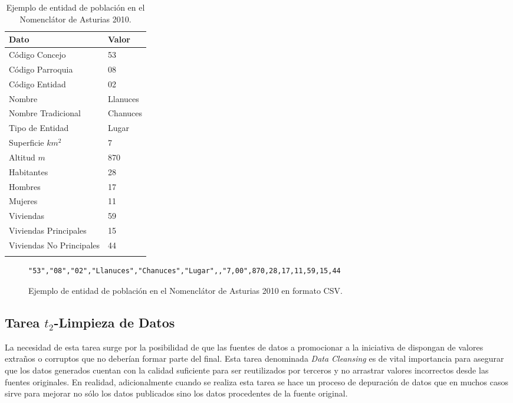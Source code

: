 \begin{longtable}[c]{|p{8cm}|p{4cm}|} 

\hline

  \textbf{Dato} &  \textbf{Valor} \\\hline

\endhead
Código Concejo & 53 \\ \hline
Código Parroquia & 08 \\ \hline
Código Entidad & 02 \\ \hline
Nombre & Llanuces \\ \hline
Nombre Tradicional & Chanuces \\ \hline
Tipo de Entidad & Lugar \\ \hline
Superficie $km^{2}$ & 7 \\ \hline
Altitud $m$ & 870 \\ \hline
Habitantes & 28 \\ \hline
Hombres & 17 \\ \hline
Mujeres & 11 \\ \hline
Viviendas & 59 \\ \hline
Viviendas Principales & 15 \\ \hline
Viviendas No Principales & 44 \\ \hline
\hline
\caption{Ejemplo de entidad de población en el Nomenclátor de Asturias 2010.}  \label{tabla:ejemplo-datos}\\    
\end{longtable}

\begin{figure}[!htp]
\begin{lstlisting}
"53","08","02","Llanuces","Chanuces","Lugar",,"7,00",870,28,17,11,59,15,44
\end{lstlisting}
	\caption{Ejemplo de entidad de población en el Nomenclátor de Asturias 2010 en formato CSV.}
	\label{fig:ejemplo-datos-csv}
\end{figure}


\subsection{Tarea $t_2$-Limpieza de Datos}
La necesidad de esta tarea surge por la posibilidad de que las fuentes de datos a promocionar a la iniciativa de \linkeddata
dispongan de valores extraños o corruptos que no deberían formar parte del \dataset final. Esta tarea
denominada \textit{Data Cleansing} es de vital importancia para asegurar que los datos generados cuentan con la calidad suficiente para
ser reutilizados por terceros y no arrastrar valores incorrectos desde las fuentes originales. En realidad, adicionalmente
cuando se realiza esta tarea se hace un proceso de depuración de datos que en muchos casos sirve para mejorar no sólo los 
datos publicados sino los datos procedentes de la fuente original.


